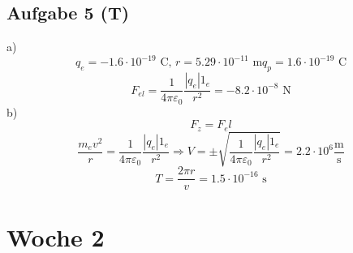 \documentclass{article}
\begin{document}
\subsection*{Aufgabe 5 (T)}
a) \begin{equation*}
    q_e = -1.6 \cdot 10^{-19} \text{ C}, \, r = 5.29\cdot 10^{-11}\text{ m} q_p = 1.6 \cdot 10^{-19} \text{ C}
\end{equation*}
\begin{equation*}
    F_{el} = \frac{1}{4\pi\varepsilon_0}\frac{|q_e|1_e}{r^2} = -8.2 \cdot 10^{-8} \text{ N}
\end{equation*}
b)
\begin{equation*}
    F_z = F_el
\end{equation*}
\begin{equation*}
    \frac{m_ev^2}{r}=\frac{1}{4\pi\varepsilon_0}\frac{|q_e|1_e}{r^2} \Rightarrow V = \pm \sqrt{\frac{1}{4\pi\varepsilon_0}\frac{|q_e|1_e}{r^2}} = 2.2 \cdot 10^6 \mathrm{\frac{m}{s}}
\end{equation*}
\begin{equation*}
    T = \frac{2\pi r}{v}=1.5 \cdot 10^{-16}\text{ s}
\end{equation*}

\section*{Woche 2}
\end{document}
